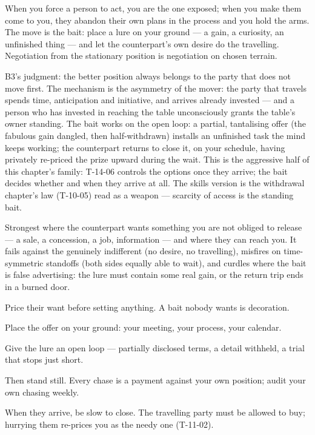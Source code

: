 \begin{core}
When you force a person to act, you are the one exposed; when you make them come to you, they abandon their own plans in the process and you hold the arms. The move is the bait: place a lure on your ground --- a gain, a curiosity, an unfinished thing --- and let the counterpart's own desire do the travelling. Negotiation from the stationary position is negotiation on chosen terrain.
\end{core}
\begin{mechanism}
B3's judgment: the better position always belongs to the party that does not move first. The mechanism is the asymmetry of the mover: the party that travels spends time, anticipation and initiative, and arrives already invested --- and a person who has invested in reaching the table unconsciously grants the table's owner standing. The bait works on the open loop: a partial, tantalising offer (the fabulous gain dangled, then half-withdrawn) installs an unfinished task the mind keeps working; the counterpart returns to close it, on your schedule, having privately re-priced the prize upward during the wait. This is the aggressive half of this chapter's family: T-14-06 controls the options once they arrive; the bait decides whether and when they arrive at all. The skills version is the withdrawal chapter's law (T-10-05) read as a weapon --- scarcity of access is the standing bait.
\end{mechanism}
\begin{conditions}
Strongest where the counterpart wants something you are not obliged to release --- a sale, a concession, a job, information --- and where they can reach you. It fails against the genuinely indifferent (no desire, no travelling), misfires on time-symmetric standoffs (both sides equally able to wait), and curdles where the bait is false advertising: the lure must contain some real gain, or the return trip ends in a burned door.
\end{conditions}
\begin{application}
  \item Price their want before setting anything. A bait nobody wants is decoration.
  \item Place the offer on your ground: your meeting, your process, your calendar.
  \item Give the lure an open loop --- partially disclosed terms, a detail withheld, a trial that stops just short.
  \item Then stand still. Every chase is a payment against your own position; audit your own chasing weekly.
  \item When they arrive, be slow to close. The travelling party must be allowed to buy; hurrying them re-prices you as the needy one (T-11-02).
\end{application}
